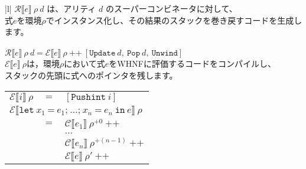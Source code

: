 \documentclass{jarticle}
\begin{document}
\begin{tabular} {|l|} \hline
	$\mathcal{R}\llbracket e \rrbracket ~ \rho ~ d$ は、アリティ $d$ のスーパーコンビネータに対して、                                                                          \\
	式$e$を環境$\rho$でインスタンス化し、その結果のスタックを巻き戻すコードを生成します。                                                                                      \\
	\\
	$\mathcal{R} \llbracket e \rrbracket ~ \rho ~ d = \mathcal{E} \llbracket e \rrbracket ~ \rho ~ \texttt{++} ~ [\texttt{Update} ~ d, ~ \texttt{Pop} ~ d, ~ \texttt{Unwind}]$ \\ \hline
	$\mathcal{E} \llbracket e \rrbracket ~ \rho$は，環境$\rho$において式$e$をWHNFに評価するコードをコンパイルし、                                                              \\
	スタックの先頭に式へのポインタを残します。                                                                                                                                 \\
	\begin{tabular}{r c l}
		$\mathcal{E} \llbracket i \rrbracket ~ \rho$                             & $=$ & $\left[\texttt{Pushint} ~ i \right]$                                                                                            \\
		\multicolumn{3}{l}{$\mathcal{E} \llbracket \texttt{let} ~ x_1 ~ \texttt{=} ~ e_1\texttt{;} ~  \ldots \texttt{;} ~ x_n ~ \texttt{=} ~ e_n ~ \texttt{in} ~ e \rrbracket ~ \rho$}                                   \\
		                                                                         & $=$ & $\mathcal{C} \llbracket e_1 \rrbracket ~ \rho^{+0} ~ \texttt{++}$                                                               \\
		                                                                         &     & $\ldots$                                                                                                                        \\
		                                                                         &     & $\mathcal{C} \llbracket e_n \rrbracket ~ \rho^{+(n - 1)} ~ \texttt{++}$                                                         \\
		                                                                         &     & $\mathcal{E} \llbracket e \rrbracket ~ \rho' ~ \texttt{++}$                                                                     \\

\end{tabular}
\end{tabular}
\end{document}
